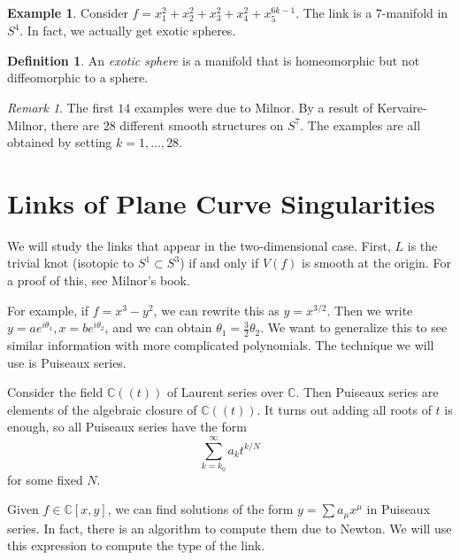 \documentclass[leqno, openany]{memoir}
\theoremstyle{definition}
\newtheorem{defn}[thm]{Definition}
\newtheorem{exm}[thm]{Example}
\theoremstyle{remark}
\newtheorem{rmk}[thm]{Remark}
\theoremstyle{plain}
\theoremstyle{definition}
\theoremstyle{remark}
\renewcommand{\C}{\mathbb{C}}
\begin{document}
\begin{exm}
    Consider $f = x_1^2 + x_2^2 + x_3^2 + x_4^2 + x_5^{6k-1}$. The link is a $7$-manifold in $S^4$. In fact, we actually get exotic spheres.
\end{exm}

\begin{defn}
    An \textit{exotic sphere} is a manifold that is homeomorphic but not diffeomorphic to a sphere.
\end{defn}

\begin{rmk}
    The first $14$ examples were due to Milnor. By a result of Kervaire-Milnor, there are $28$ different smooth structures on $S^7$. The examples are all obtained by setting $k = 1, \ldots, 28$.
\end{rmk}

\section{Links of Plane Curve Singularities}%
\label{sec:algebraic_knots_and_links}

We will study the links that appear in the two-dimensional case. First, $L$ is the trivial knot (isotopic to $S^1 \subset S^3$) if and only if $V(f)$ is smooth at the origin. For a proof of this, see Milnor's book.

For example, if $f = x^3 - y^2$, we can rewrite this as $y = x^{3/2}$. Then we write $y = ae^{i\theta_1}, x = be^{i\theta_2}$, and we can obtain $\theta_1 = \frac{3}{2} \theta_2$. We want to generalize this to see similar information with more complicated polynomials. The technique we will use is Puiseaux series.

Consider the field $\C((t))$ of Laurent series over $\C$. Then Puiseaux series are elements of the algebraic closure of $\C((t))$. It turns out adding all roots of $t$ is enough, so all Puiseaux series have the form
\[ \sum_{k = k_0}^{\infty} a_k t^{k/N} \]
for some fixed $N$. 

Given $f \in \C[x,y]$, we can find solutions of the form $y = \sum a_{\mu} x^{\mu}$ in Puiseaux series. In fact, there is an algorithm to compute them due to Newton. We will use this expression to compute the type of the link.
\end{document}
